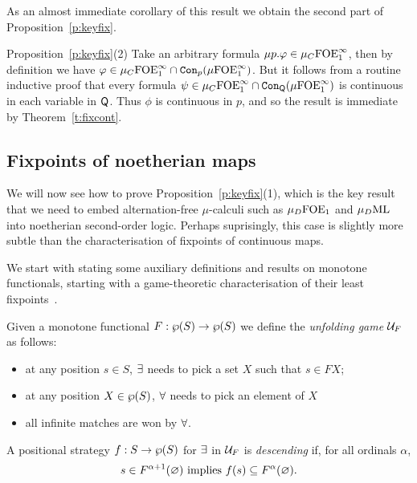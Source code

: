 \noindent
As an almost immediate corollary of this result we obtain the second part of 
Proposition~\ref{p:keyfix}.

\begin{proofof}{Proposition~\ref{p:keyfix}(2)}
Take an arbitrary formula $\mu p. \varphi \in \mu_{C}\mathrm{FOE}^{\infty}_1$, then by definition 
we have $\varphi \in \mu_{C}\mathrm{FOE}^{\infty}_1 \cap \mathtt{Con}_{p}(\mu\mathrm{FOE}^{\infty}_1)$.
But it follows from a routine inductive proof that every formula $\psi \in 
\mu_{C}\mathrm{FOE}^{\infty}_1 \cap \mathtt{Con}_{\mathsf{Q}}(\mu\mathrm{FOE}^{\infty}_1)$ is continuous in each variable 
in $\mathsf{Q}$.
Thus $\phi$ is continuous in $p$, and so the result is immediate by 
Theorem~\ref{t:fixcont}.
\end{proofof}



\subsection{Fixpoints of noetherian maps}

We will now see how to prove Proposition~\ref{p:keyfix}(1), which is the key 
result that we need to embed alternation-free $\mu$-calculi such as 
$\mu_{D}\mathrm{FOE}_1$ and $\mu_{D}\mathrm{ML}$ into noetherian second-order logic.
Perhaps suprisingly, this case is slightly more subtle than the characterisation of
fixpoints of continuous maps.

We start with stating some auxiliary definitions and results on monotone 
functionals, starting with a game-theoretic characterisation of their least
fixpoints~\cite{Ven08}.

\begin{definition}
\label{d:unfgame}
Given a monotone functional $F: \wp(S)\to \wp(S)$ we define the 
\emph{unfolding game} $\mathcal{U}_{F}$ as follows:
\begin{itemize}
\item at any position $s \in S$, $\exists$ needs to pick a set $X$ such that 
$s \in FX$;
\item at any position $X \in \wp(S)$, $\forall$ needs to pick an element of 
$X$
\item all infinite matches are won by $\forall$.
\end{itemize}
A positional strategy $f: S \to \wp(S)$ for $\exists$ in $\mathcal{U}_{F}$ is 
\emph{descending} if, for all ordinals $\alpha$,
\begin{equation}
\label{eq:dec}
s \in F^{\alpha+1}(\nada) \text{ implies } \ystrat(s) \sse F^{\alpha}(\nada).
\end{equation}
\end{definition}

